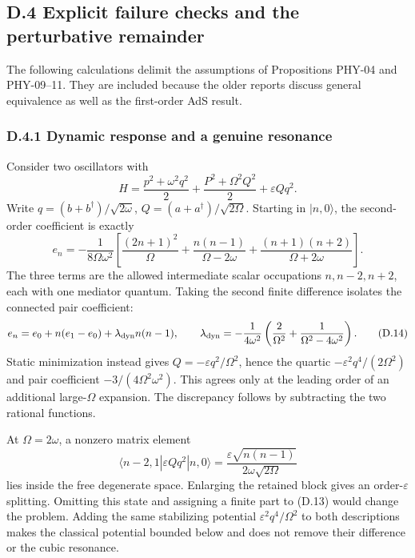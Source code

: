 \documentclass[a4paper,11pt]{article}
\numberwithin{equation}{section}
\begin{document}
\hypertarget{d.4-explicit-failure-checks-and-the-perturbative-remainder}{%
\subsection{D.4 Explicit failure checks and the perturbative remainder}\label{d.4-explicit-failure-checks-and-the-perturbative-remainder}}

The following calculations delimit the assumptions of Propositions PHY-04 and PHY-09--11. They are included because the older reports discuss general equivalence as well as the first-order AdS result.

\hypertarget{d.4.1-dynamic-response-and-a-genuine-resonance}{%
\subsubsection{D.4.1 Dynamic response and a genuine resonance}\label{d.4.1-dynamic-response-and-a-genuine-resonance}}

Consider two oscillators with \[
H=\frac{p^2+\omega^2q^2}{2}
+\frac{P^2+\Omega^2Q^2}{2}+\varepsilon Qq^2.
\tag{D.12}
\] Write \(q=(b+b^\dagger)/\sqrt{2\omega}\), \(Q=(a+a^\dagger)/\sqrt{2\Omega}\). Starting in \(|n,0\rangle\), the second-order coefficient is exactly \[
e_n=-\frac1{8\Omega\omega^2}
\left[\frac{(2n+1)^2}{\Omega}
+\frac{n(n-1)}{\Omega-2\omega}
+\frac{(n+1)(n+2)}{\Omega+2\omega}\right].
\tag{D.13}
\] The three terms are the allowed intermediate scalar occupations \(n,n-2,n+2\), each with one mediator quantum. Taking the second finite difference isolates the connected pair coefficient: \[
e_n=e_0+n(e_1-e_0)+\lambda_{\rm dyn}n(n-1),\qquad
\lambda_{\rm dyn}=-\frac1{4\omega^2}
\left(\frac2{\Omega^2}+\frac1{\Omega^2-4\omega^2}\right).
\tag{D.14}
\] Static minimization instead gives \(Q=-\varepsilon q^2/\Omega^2\), hence the quartic \(-\varepsilon^2q^4/(2\Omega^2)\) and pair coefficient \(-3/(4\Omega^2\omega^2)\). This agrees only at the leading order of an additional large-\(\Omega\) expansion. The discrepancy follows by subtracting the two rational functions.

At \(\Omega=2\omega\), a nonzero matrix element \[
\langle n-2,1|\varepsilon Qq^2|n,0\rangle
=\frac{\varepsilon\sqrt{n(n-1)}}{2\omega\sqrt{2\Omega}}
\tag{D.15}
\] lies inside the free degenerate space. Enlarging the retained block gives an order-\(\varepsilon\) splitting. Omitting this state and assigning a finite part to (D.13) would change the problem. Adding the same stabilizing potential \(\varepsilon^2q^4/\Omega^2\) to both descriptions makes the classical potential bounded below and does not remove their difference or the cubic resonance.
\end{document}

